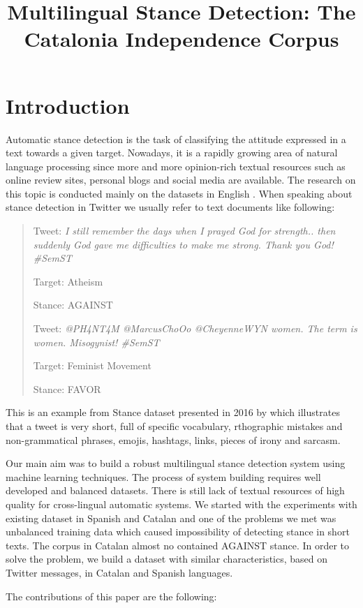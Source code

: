\documentclass[10pt, a4paper]{article}
\title{Multilingual Stance Detection: The Catalonia Independence Corpus}
\begin{document}
\maketitleabstract

\section{Introduction}

Automatic stance detection is the task of classifying the attitude expressed in a text towards a given target. Nowadays, it is a rapidly growing area of natural language processing since more and more opinion-rich textual resources such as online review sites, personal blogs and social media are available. The research on this topic is conducted mainly on the datasets in English \cite{mohammad-etal-2016-semeval,augenstein-etal-2016-stance}.  When speaking about stance detection in Twitter we usually refer to text documents like following:


\begin{quote}
Tweet: \textit{I still remember the days when I prayed God for strength.. then suddenly God gave me difficulties to make me strong. Thank you God! \#SemST}

Target: Atheism

Stance: AGAINST

Tweet: \textit{@PH4NT4M @MarcusChoOo @CheyenneWYN women. The term is women. Misogynist! \#SemST}

Target: Feminist Movement

Stance: FAVOR
\end{quote}

This is an example from Stance dataset presented in 2016 by \cite{Mohammad2016ADF} which illustrates that a tweet is very short, full of specific vocabulary, rthographic mistakes and non-grammatical phrases, emojis, hashtags, links, pieces of irony and sarcasm.

Our main aim was to build a robust multilingual stance detection system using machine learning techniques. The process of system building requires well developed and balanced datasets. There is still lack of textual resources of high quality for cross-lingual automatic systems. We started with the experiments with existing dataset in Spanish and Catalan \cite{taule18} and one of the problems we met was unbalanced training data which caused impossibility of detecting stance in short texts. The corpus in Catalan almost no contained AGAINST stance. In order to solve the problem, we build a dataset with similar characteristics, based on Twitter messages, in Catalan and Spanish languages.

The contributions of this paper are the following:
\end{document}
